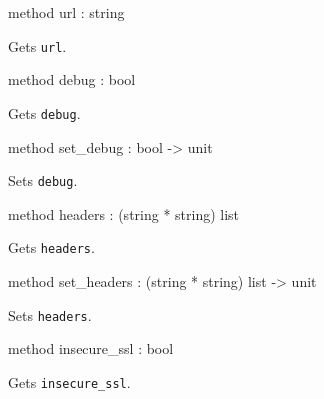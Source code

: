 \documentclass[11pt]{article}
\begin{document}
\begin{ocamldocobjectend}
\begin{ocamldocdescription}
\end{ocamldocdescription}


\label{method:XmlRpc.client.url}\begin{ocamldoccode}
method url : string
\end{ocamldoccode}
\begin{ocamldocdescription}
Gets {\tt{url}}.


\end{ocamldocdescription}


\label{method:XmlRpc.client.debug}\begin{ocamldoccode}
method debug : bool
\end{ocamldoccode}
\begin{ocamldocdescription}
Gets {\tt{debug}}.


\end{ocamldocdescription}


\label{method:XmlRpc.client.set-underscoredebug}\begin{ocamldoccode}
method set_debug : bool -> unit
\end{ocamldoccode}
\begin{ocamldocdescription}
Sets {\tt{debug}}.


\end{ocamldocdescription}


\label{method:XmlRpc.client.headers}\begin{ocamldoccode}
method headers : (string * string) list
\end{ocamldoccode}
\begin{ocamldocdescription}
Gets {\tt{headers}}.


\end{ocamldocdescription}


\label{method:XmlRpc.client.set-underscoreheaders}\begin{ocamldoccode}
method set_headers : (string * string) list -> unit
\end{ocamldoccode}
\begin{ocamldocdescription}
Sets {\tt{headers}}.


\end{ocamldocdescription}


\label{method:XmlRpc.client.insecure-underscoressl}\begin{ocamldoccode}
method insecure_ssl : bool
\end{ocamldoccode}
\begin{ocamldocdescription}
Gets {\tt{insecure\_ssl}}.



\end{ocamldocdescription}
\end{ocamldocobjectend}
\end{document}
